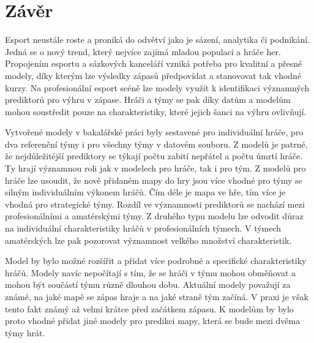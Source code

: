\chapter{Závěr}
Esport neustále roste a proniká do odvětví jako je sázení, analytika či podnikání. Jedná se o nový trend, který nejvíce zajímá mladou populaci a hráče her.
Propojením esportu a sázkových kanceláří vzniká potřeba pro kvalitní a přesné modely, díky kterým lze výsledky zápasů předpovídat a stanovovat tak
vhodné kurzy. Na profesionální esport scéně lze modely využít k identifikaci významných prediktorů pro výhru v zápase. Hráči a týmy se pak díky datům a modelům mohou soustředit
pouze na charakteristiky, které jejich šanci na výhru ovlivňují.

Vytvořené modely v bakalářské práci byly sestavené pro individuální hráče, pro dva referenční týmy i pro všechny týmy v datovém souboru. Z modelů
je patrné, že nejdůležitější prediktory se týkají počtu zabití nepřátel a počtu úmrtí hráče. Ty hrají významnou roli jak v modelech pro hráče, tak i pro tým. 
Z modelů pro hráče lze usoudit, že nově přidaném mapy do hry jsou více vhodné pro týmy se silným individuálním výkonem hráčů. Čím déle je mapa ve hře, tím více
je vhodná pro strategické týmy. Rozdíl ve významnosti prediktorů se nachází mezi profesionálními a amatérskými týmy. Z druhého typu modelu lze odvodit důraz na individuální
charakteristiky hráčů v profesionálních týmech. V týmech amatérských lze pak pozorovat významnost velkého množství charakteristik.

Model by bylo možné rozšířit a přidat více podrobné a specifické charakteristiky hráčů. Modely navíc nepočítají s tím, že se hráči v týmu mohou obměňovat a mohou být
součástí týmu různě dlouhou dobu. Aktuální modely považují za známé, na jaké mapě se zápas hraje a na jaké straně tým začíná. V praxi je však tento fakt známý
až velmi krátce před začátkem zápasu. K modelům by bylo proto vhodné přidat jiné modely pro predikci mapy, která se bude mezi dvěma týmy hrát.
